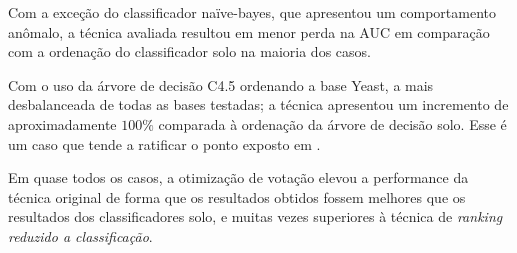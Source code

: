 Com a exceção do classificador naïve-bayes, que apresentou um comportamento anômalo, a técnica avaliada resultou em menor perda na AUC em comparação com a ordenação do classificador solo na maioria dos casos.

Com o uso da árvore de decisão C4.5 ordenando a base Yeast, a mais desbalanceada de todas as bases testadas; a técnica apresentou um incremento de aproximadamente $100\%$ comparada à ordenação da árvore de decisão solo. Esse é um caso que tende a ratificar o ponto exposto em \cite{langford08}.

Em quase todos os casos, a otimização de votação elevou a performance da técnica original de forma que os resultados obtidos fossem melhores que os resultados dos classificadores solo, e muitas vezes superiores à técnica de \emph{ranking reduzido a classificação}.